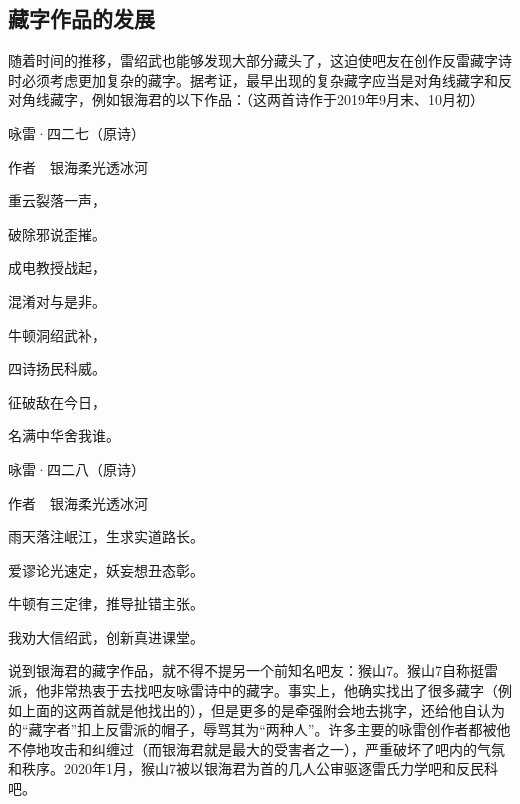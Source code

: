 \documentclass[UTF8,12pt,oneside]{ctexbook}
\begin{document}
    \subsection{藏字作品的发展}
        随着时间的推移，雷绍武也能够发现大部分藏头了，这迫使吧友在创作反雷藏字诗时必须考虑更加复杂的藏字。据考证，最早出现的复杂藏字应当是对角线藏字和反对角线藏字，例如银海君的以下作品：（这两首诗作于2019年9月末、10月初）

        \begin{center}
            
            \heiti 咏雷·四二七（原诗）
            
            \songti 作者\ \ 银海柔光透冰河
            
            \kaishu
            重云裂落一声，
            
            破除邪说歪摧。
            
            成电教授战起，
            
            混淆对与是非。
            
            牛顿洞绍武补，
            
            四诗扬民科威。
            
            征破敌在今日，
            
            名满中华舍我谁。

        \end{center}
    
        \begin{center}
            
            \heiti 咏雷·四二八（原诗）
            
            \songti 作者\ \ 银海柔光透冰河
            
            \kaishu
            雨天落注岷江，生求实道路长。
            
            爱谬论光速定，妖妄想丑态彰。
            
            牛顿有三定律，推导扯错主张。
            
            我劝大信绍武，创新真进课堂。

        \end{center}
        
        说到银海君的藏字作品，就不得不提另一个前知名吧友：猴山7。猴山7自称挺雷派，他非常热衷于去找吧友咏雷诗中的藏字。事实上，他确实找出了很多藏字（例如上面的这两首就是他找出的），但是更多的是牵强附会地去挑字，还给他自认为的“藏字者”扣上反雷派的帽子，辱骂其为“两种人”。许多主要的咏雷创作者都被他不停地攻击和纠缠过（而银海君就是最大的受害者之一），严重破坏了吧内的气氛和秩序。2020年1月，猴山7被以银海君为首的几人公审驱逐雷氏力学吧和反民科吧。
\end{document}
